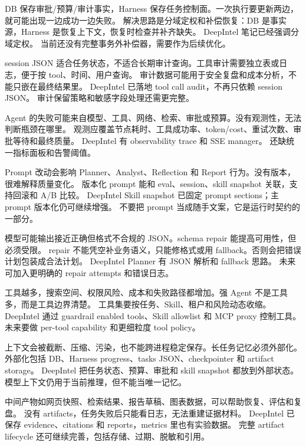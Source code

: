 {DB 保存审批/预算/审计事实，Harness 保存任务控制面。一次执行要更新两边，就可能出现一边成功一边失败。}
{解决思路是分域定权和补偿恢复：DB 是事实源，Harness 是恢复上下文，恢复时检查并补齐缺失。}
{DeepIntel 笔记已经强调分域定权。}
{当前还没有完整事务外补偿器，需要作为后续优化。}

{session JSON 适合任务状态，不适合长期审计查询。工具审计需要独立表或日志，便于按 tool、时间、用户查询。}
{审计数据可能用于安全复盘和成本分析，不能只嵌在最终结果里。}
{DeepIntel 已落地 tool call audit，不再只依赖 session JSON。}
{审计保留策略和敏感字段处理还需更完整。}

{Agent 的失败可能来自模型、工具、网络、检索、审批或预算。没有观测性，无法判断瓶颈在哪里。}
{观测应覆盖节点耗时、工具成功率、token/cost、重试次数、审批等待和最终质量。}
{DeepIntel 有 observability trace 和 SSE manager。}
{还缺统一指标面板和告警阈值。}

{Prompt 改动会影响 Planner、Analyst、Reflection 和 Report 行为。没有版本，很难解释质量变化。}
{版本化 prompt 能和 eval、session、skill snapshot 关联，支持回滚和 A/B 比较。}
{DeepIntel Skill snapshot 已固定 prompt sections；主 prompt 版本化仍可继续增强。}
{不要把 prompt 当成随手文案，它是运行时契约的一部分。}

{模型可能输出接近正确但格式不合规的 JSON。schema repair 能提高可用性，但必须受限。}
{repair 不能凭空补业务语义，只能修格式或用 fallback。否则会把错误计划包装成合法计划。}
{DeepIntel Planner 有 JSON 解析和 fallback 思路。}
{未来可加入更明确的 repair attempts 和错误日志。}

{工具越多，搜索空间、权限风险、成本和失败路径都增加。强 Agent 不是工具多，而是工具边界清楚。}
{工具集要按任务、Skill、租户和风险动态收缩。}
{DeepIntel 通过 guardrail enabled tools、Skill allowlist 和 MCP proxy 控制工具。}
{未来要做 per-tool capability 和更细粒度 tool policy。}

{上下文会被截断、压缩、污染，也不能跨进程稳定保存。长任务记忆必须外部化。}
{外部化包括 DB、Harness progress、tasks JSON、checkpointer 和 artifact storage。}
{DeepIntel 把任务状态、预算、审批和 skill snapshot 都放到外部状态。}
{模型上下文仍用于当前推理，但不能当唯一记忆。}

{中间产物如网页快照、检索结果、报告草稿、图表数据，可以帮助恢复、评估和复盘。}
{没有 artifacts，任务失败后只能看日志，无法重建证据材料。}
{DeepIntel 已保存 evidence、citations 和 reports，metrics 里也有实验数据。}
{完整 artifact lifecycle 还可继续完善，包括存储、过期、脱敏和引用。}

